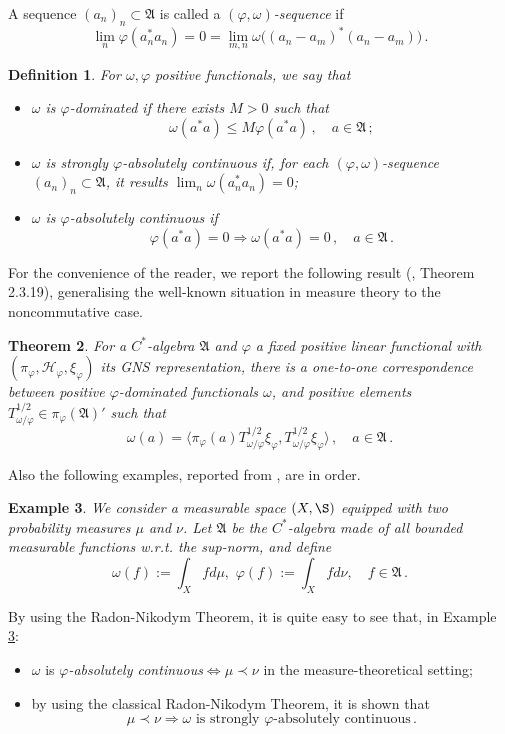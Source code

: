 \documentclass[12pt]{amsart}
\numberwithin{equation}{section}
\def\ch{{\mathcal H}}
\def\ga{{\mathfrak A}} \def\gpa{{\mathfrak a}}
\def\m{\mu}
\def\n{\nu}
\def\f{\varphi}\def\ff{\phi} \def\F{\Phi}
\def\om{\omega} \def\Om{\Omega}
\newtheorem{thm}{Theorem}[section]
\newtheorem{defin}[thm]{Definition}
\newtheorem{exa}[thm]{Example}
\begin{document}
A sequence 
$(a_n)_n\subset\ga$ is called a $(\f,\om)${\it -sequence} if
$$
\lim_n\f(a_n^*a_n)=0=\lim_{m,n}\om\big((a_n-a_m)^*(a_n-a_m)\big)\,.
$$
\begin{defin}
\label{dom}
For $\om,\f$ positive functionals, we say that 
\begin{itemize}
\item[(i)] $\om$ is $\f$-{\it dominated} if there exists $M>0$ such that
$$
\om(a^*a)\leq M\f(a^*a)\,,\quad a\in\ga\,;
$$
\item[(ii)] $\om$ is {\it strongly $\f$-absolutely continuous} if, for each $(\f,\om)$-sequence $(a_n)_n\subset\ga$, it results
$\lim_n\om(a_n^*a_n)=0$;
\item[(iii)] $\om$ is {\it $\f$-absolutely continuous} if
$$
\f(a^*a)=0\Rightarrow\om(a^*a)=0\,,\quad a\in\ga\,.
$$
\end{itemize}
\end{defin}
For the convenience of the reader, we report the following result (\cite{BR}, Theorem 2.3.19), generalising the well-known situation in measure theory to the noncommutative case.
\begin{thm}
\label{borarb}
For a $C^*$-algebra $\ga$ and $\f$ a fixed positive linear functional with $(\pi_\f,\ch_\f,\xi_\f)$ its GNS representation, there is a one-to-one correspondence between positive $\f$-dominated functionals $\om$, and positive elements $T^{1/2}_{\om/\f}\in\pi_\f(\ga)'$ such that
$$
\om(a)=\langle\pi_\f(a)T^{1/2}_{\om/\f}\xi_\f,T^{1/2}_{\om/\f}\xi_\f\rangle\,,\quad a\in\ga\,.
$$
\end{thm}
Also the following examples, reported from \cite{G}, are in order.
\begin{exa}
\label{exa1}
We consider a measurable space $(X,\S)$ equipped with two probability measures $\m$ and $\n$. Let $\ga$ be the $C^*$-algebra made of all bounded measurable functions w.r.t. the sup-norm, and define
$$
\om(f):=\int_X fd\m,\,\,\f(f):=\int_X fd\n,\quad f\in\ga\,.
$$
\end{exa}
By using the Radon-Nikodym Theorem, it is quite easy to see that, in Example \ref{exa1}:
\begin{itemize}
\item[$1^o$] $\om$ is {\it $\f$-absolutely continuous}$\iff \m\prec\n$ in the measure-theoretical setting;
\item[$2^o$] by using the classical Radon-Nikodym Theorem, it is shown that
$$
\m\prec\n\Rightarrow\om\,\,\text{is strongly $\f$-absolutely continuous}\,. 
$$
\end{itemize}
\end{document}
